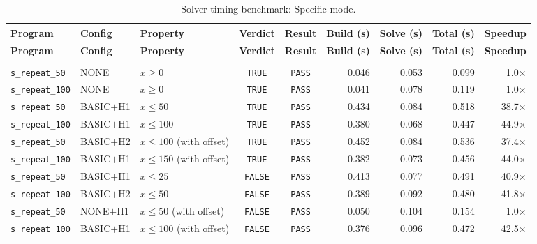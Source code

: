 {\small
\begin{longtable}{p{} p{} p{} c c r r r r}
\caption{Solver timing benchmark: Specific mode.}
\label{tab:timing-specific} \\
\toprule
\textbf{Program} & \textbf{Config} & \textbf{Property} & \textbf{Verdict} & \textbf{Result} & \textbf{Build (s)} & \textbf{Solve (s)} & \textbf{Total (s)} & \textbf{Speedup} \\
\midrule
\endfirsthead
\toprule
\textbf{Program} & \textbf{Config} & \textbf{Property} & \textbf{Verdict} & \textbf{Result} & \textbf{Build (s)} & \textbf{Solve (s)} & \textbf{Total (s)} & \textbf{Speedup} \\
\midrule
\endhead
\midrule
\endfoot
\bottomrule
\endlastfoot
\multicolumn{9}{l}{\textit{Specific mode -- Loop Scaling}} \\
\midrule
\texttt{s\_repeat\_50} & NONE & $x \geq 0$ & \texttt{TRUE} & \texttt{PASS} & 0.046 & 0.053 & 0.099 & 1.0$\times$ \\
\texttt{s\_repeat\_100} & NONE & $x \geq 0$ & \texttt{TRUE} & \texttt{PASS} & 0.041 & 0.078 & 0.119 & 1.0$\times$ \\
\texttt{s\_repeat\_50} & BASIC$+$H1 & $x \leq 50$ & \texttt{TRUE} & \texttt{PASS} & 0.434 & 0.084 & 0.518 & 38.7$\times$ \\
\texttt{s\_repeat\_100} & BASIC$+$H1 & $x \leq 100$ & \texttt{TRUE} & \texttt{PASS} & 0.380 & 0.068 & 0.447 & 44.9$\times$ \\
\texttt{s\_repeat\_50} & BASIC$+$H2 & $x \leq 100$ (with offset) & \texttt{TRUE} & \texttt{PASS} & 0.452 & 0.084 & 0.536 & 37.4$\times$ \\
\texttt{s\_repeat\_100} & BASIC$+$H1 & $x \leq 150$ (with offset) & \texttt{TRUE} & \texttt{PASS} & 0.382 & 0.073 & 0.456 & 44.0$\times$ \\
\texttt{s\_repeat\_50} & BASIC$+$H1 & $x \leq 25$ & \texttt{FALSE} & \texttt{PASS} & 0.413 & 0.077 & 0.491 & 40.9$\times$ \\
\texttt{s\_repeat\_100} & BASIC$+$H2 & $x \leq 50$ & \texttt{FALSE} & \texttt{PASS} & 0.389 & 0.092 & 0.480 & 41.8$\times$ \\
\texttt{s\_repeat\_50} & NONE$+$H1 & $x \leq 50$ (with offset) & \texttt{FALSE} & \texttt{PASS} & 0.050 & 0.104 & 0.154 & 1.0$\times$ \\
\texttt{s\_repeat\_100} & BASIC$+$H1 & $x \leq 100$ (with offset) & \texttt{FALSE} & \texttt{PASS} & 0.376 & 0.096 & 0.472 & 42.5$\times$ \\
\midrule

\end{longtable}}

